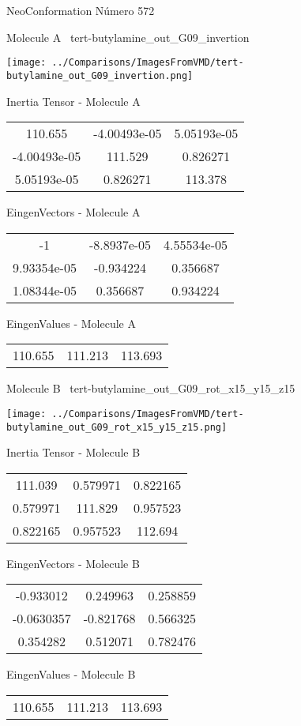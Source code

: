 \vtab[-3cm]
\begin{center}
{\large NeoConformation \tab Número 572}
\end{center}
\begin{multicols}{2}
\begin{center}

Molecule A \
tert-butylamine\_out\_G09\_invertion

\texttt{[image: ../Comparisons/ImagesFromVMD/tert-butylamine\_out\_G09\_invertion.png]}

Inertia Tensor - Molecule A \\
\begin{tabular}{|c c c|}
110.655	 & 	-4.00493e-05	 & 	5.05193e-05	 \\
-4.00493e-05	 & 	111.529	 & 	0.826271	 \\
5.05193e-05	 & 	0.826271	 & 	113.378
\end{tabular}

\vtab
 EingenVectors - Molecule A     \\
\begin{tabular}{|c c c|}
-1	 & 	-8.8937e-05	 & 	4.55534e-05	 \\
9.93354e-05	 & 	-0.934224	 & 	0.356687	 \\
1.08344e-05	 & 	0.356687	 & 	0.934224
\end{tabular}

\vtab
 EingenValues - Molecule A     \\
\begin{tabular}{|c c c|}
110.655	 & 	111.213	 & 	113.693	 \\
\end{tabular}
\columnbreak

Molecule B \
tert-butylamine\_out\_G09\_rot\_x15\_y15\_z15

\texttt{[image: ../Comparisons/ImagesFromVMD/tert-butylamine\_out\_G09\_rot\_x15\_y15\_z15.png]}

Inertia Tensor - Molecule B \\
\begin{tabular}{|c c c|}
111.039	 & 	0.579971	 & 	0.822165	 \\
0.579971	 & 	111.829	 & 	0.957523	 \\
0.822165	 & 	0.957523	 & 	112.694
\end{tabular}

\vtab
 EingenVectors - Molecule B     \\
\begin{tabular}{|c c c|}
-0.933012	 & 	0.249963	 & 	0.258859	 \\
-0.0630357	 & 	-0.821768	 & 	0.566325	 \\
0.354282	 & 	0.512071	 & 	0.782476
\end{tabular}

\vtab
 EingenValues - Molecule B     \\
\begin{tabular}{|c c c|}
110.655	 & 	111.213	 & 	113.693	 \\
\end{tabular}

\end{center}
\end{multicols}

